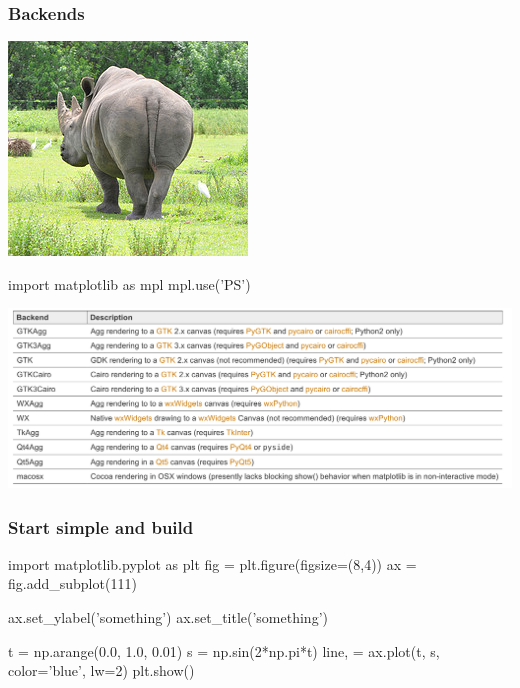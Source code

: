 \documentclass[xcolor=dvipsnames]{beamer}
\begin{document}
\begin{frame}[fragile]
\frametitle{Backends}
\begin{center}
  \includegraphics[scale=1.2]{backend.jpg}
\end{center}

\begin{code}
import matplotlib as mpl
mpl.use('PS')
\end{code}

\begin{center}
  \includegraphics[scale=0.15]{backends-table.png}
\end{center}

\end{frame}

\begin{frame}[fragile]
\frametitle{Start simple and build}

\begin{code}
import matplotlib.pyplot as plt
fig = plt.figure(figsize=(8,4))
ax = fig.add_subplot(111)

ax.set_ylabel('something')
ax.set_title('something')

t = np.arange(0.0, 1.0, 0.01)
s = np.sin(2*np.pi*t)
line, = ax.plot(t, s, color='blue', lw=2)
plt.show()
\end{code}
\end{frame}
\end{document}
